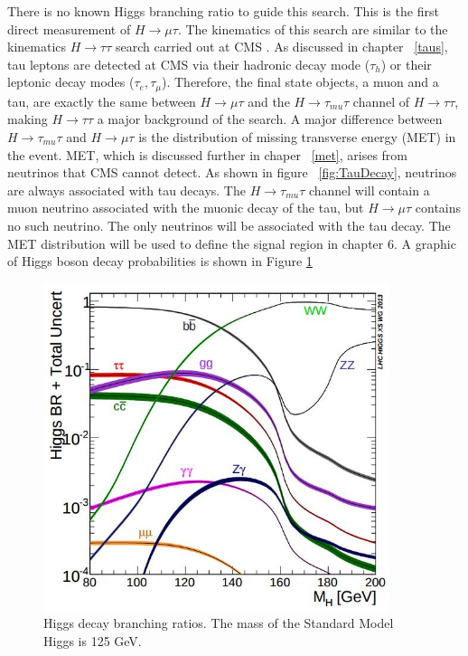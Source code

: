 \documentclass[oneside, letterpaper, oldfontcommands]{memoir}
\begin{document}
\qquad There is no known Higgs branching ratio to guide this search. This is the first direct measurement of $H \rightarrow \mu \tau$. The kinematics of this search are similar to the kinematics $H \rightarrow \tau\tau$ search carried out at CMS \cite{Chatrchyan:2012xdj}. As discussed in chapter ~\ref{taus}, tau leptons are detected at CMS via their hadronic decay mode ($\tau_{h}$) or their leptonic decay modes ($\tau_{e}, \tau_{\mu}$). Therefore, the final state objects, a muon and a tau, are exactly the same between $H \rightarrow \mu \tau$ and the $H \rightarrow \tau_{mu} \tau$ channel of $H \rightarrow \tau\tau$, making $H \rightarrow \tau\tau$ a major background of the search. A major difference between $H \rightarrow \tau_{mu} \tau$ and $H \rightarrow \mu \tau$ is the distribution of missing transverse energy (MET) in the event. MET, which is discussed further in chaper ~\ref{met}, arises from neutrinos that CMS cannot detect. As shown in figure ~\ref{fig:TauDecay}, neutrinos are always associated with tau decays. The $H \rightarrow \tau_{mu} \tau$ channel will contain a muon neutrino associated with the muonic decay of the tau, but $H \rightarrow \mu \tau$ contains no such neutrino. The only neutrinos will be associated with the tau decay. The MET distribution will be used to define the signal region in chapter 6. A graphic of Higgs boson decay probabilities is shown in Figure \ref{fig:higgsBR}\cite{Heinemeyer:2013tqa}

\begin{figure}[here]
\includegraphics[width=0.9\textwidth]{higgsBR.jpg}
\caption{Higgs decay branching ratios\cite{Heinemeyer:2013tqa}. The mass of the Standard Model Higgs is 125 GeV. }
\label{fig:higgsBR}
\end{figure}
\end{document}
